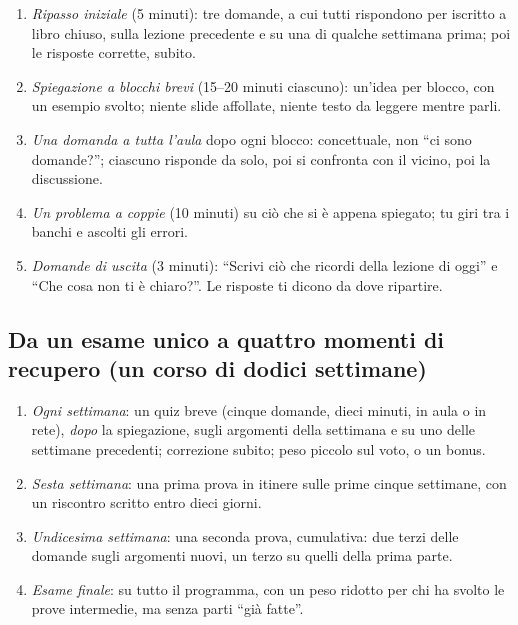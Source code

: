 \begin{enumerate}[leftmargin=1.4em, itemsep=0pt, topsep=0.2\baselineskip]
  \item \emph{Ripasso iniziale} (5 minuti): tre domande, a cui tutti
        rispondono per iscritto a libro chiuso, sulla lezione
        precedente e su una di qualche settimana prima; poi le
        risposte corrette, subito.
  \item \emph{Spiegazione a blocchi brevi} (15--20 minuti ciascuno):
        un'idea per blocco, con un esempio svolto; niente slide
        affollate, niente testo da leggere mentre parli.
  \item \emph{Una domanda a tutta l'aula} dopo ogni blocco: concettuale,
        non \enquote{ci sono domande?}; ciascuno risponde da solo, poi
        si confronta con il vicino, poi la discussione.
  \item \emph{Un problema a coppie} (10 minuti) su ciò che si è appena
        spiegato; tu giri tra i banchi e ascolti gli errori.
  \item \emph{Domande di uscita} (3 minuti): \enquote{Scrivi ciò che
        ricordi della lezione di oggi} e \enquote{Che cosa non ti è
        chiaro?}. Le risposte ti dicono da dove ripartire.
\end{enumerate}

\subsection*{Da un esame unico a quattro momenti di recupero (un corso di dodici settimane)}

\begin{enumerate}[leftmargin=1.4em, itemsep=0pt, topsep=0.2\baselineskip]
  \item \emph{Ogni settimana}: un quiz breve (cinque domande, dieci
        minuti, in aula o in rete), \emph{dopo} la spiegazione, sugli
        argomenti della settimana e su uno delle settimane precedenti;
        correzione subito; peso piccolo sul voto, o un bonus.
  \item \emph{Sesta settimana}: una prima prova in itinere sulle prime
        cinque settimane, con un riscontro scritto entro dieci giorni.
  \item \emph{Undicesima settimana}: una seconda prova, cumulativa: due
        terzi delle domande sugli argomenti nuovi, un terzo su quelli
        della prima parte.
  \item \emph{Esame finale}: su tutto il programma, con un peso ridotto
        per chi ha svolto le prove intermedie, ma senza parti
        \enquote{già fatte}.
\end{enumerate}

